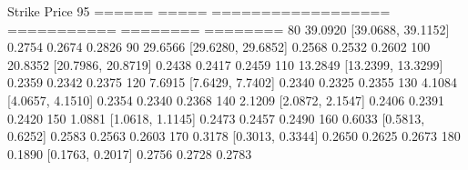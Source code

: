 Strike     Price     95%
======     =====     ==================    ===========    ========    ========
    80    39.0920   [39.0688, 39.1152]       0.2754     0.2674     0.2826
    90    29.6566   [29.6280, 29.6852]       0.2568     0.2532     0.2602
   100    20.8352   [20.7986, 20.8719]       0.2438     0.2417     0.2459
   110    13.2849   [13.2399, 13.3299]       0.2359     0.2342     0.2375
   120     7.6915   [7.6429, 7.7402]       0.2340     0.2325     0.2355
   130     4.1084   [4.0657, 4.1510]       0.2354     0.2340     0.2368
   140     2.1209   [2.0872, 2.1547]       0.2406     0.2391     0.2420
   150     1.0881   [1.0618, 1.1145]       0.2473     0.2457     0.2490
   160     0.6033   [0.5813, 0.6252]       0.2583     0.2563     0.2603
   170     0.3178   [0.3013, 0.3344]       0.2650     0.2625     0.2673
   180     0.1890   [0.1763, 0.2017]       0.2756     0.2728     0.2783